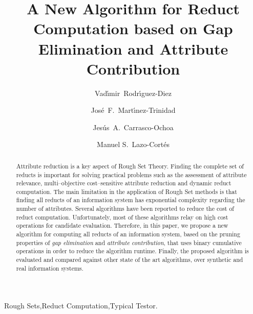 \documentclass[number,preprint,review,12pt]{elsarticle}
\begin{document}
	\title{A New Algorithm for Reduct Computation based on Gap Elimination and Attribute Contribution}
	
	\author[inaoe,uc]{Vad\'{\i}mir~Rodr\'{\i}guez-Diez}
	\author[inaoe]{Jos\'{e}~F.~Mart\'{\i}nez-Trinidad}
	\author[inaoe]{Jes\'{u}s~A.~Carrasco-Ochoa}	
	\author[inaoe]{Manuel S.~Lazo-Cort\'{e}s}
	\address[inaoe]{Computer Science Department\\
					Instituto Nacional de Astrof\'{\i}sica, \'{O}ptica y Electr\'{o}nica\\
					Luis Enrique Erro \# 1, Santa Mar\'{\i}a Tonantzintla, Puebla, 72840, M\'{e}xico} 
	\address[uc]{Electrical Engineering Department\\
				 Universidad de Camag\"{u}ey\\
				 Circv. Nte. km 5$\frac{1}{2}$, Camag\"{u}ey, Cuba}
	
	\begin{abstract}
		Attribute reduction is a key aspect of Rough Set Theory.  Finding the complete set of reducts is important for solving practical problems such as the assessment of attribute relevance, multi--objective cost--sensitive attribute reduction and dynamic reduct computation. The main limitation in the application of Rough Set methods is that finding all reducts of an information system has exponential complexity regarding the number of attributes. Several algorithms have been reported to reduce the cost of reduct computation. Unfortunately, most of these algorithms relay on high cost operations for candidate evaluation. Therefore, in this paper, we propose a new algorithm for computing all reducts of an information system, based on the pruning properties of \textit{gap  elimination} and \textit{attribute contribution}, that uses binary cumulative operations in order to reduce the algorithm runtime. Finally, the proposed algorithm is evaluated and compared against other state of the art algorithms, over synthetic and real information systems.
	\end{abstract}
	
	\begin{keyword}
		Rough Sets\sep Reduct Computation\sep Typical Testor.
	\end{keyword}

	\maketitle

\end{document}
